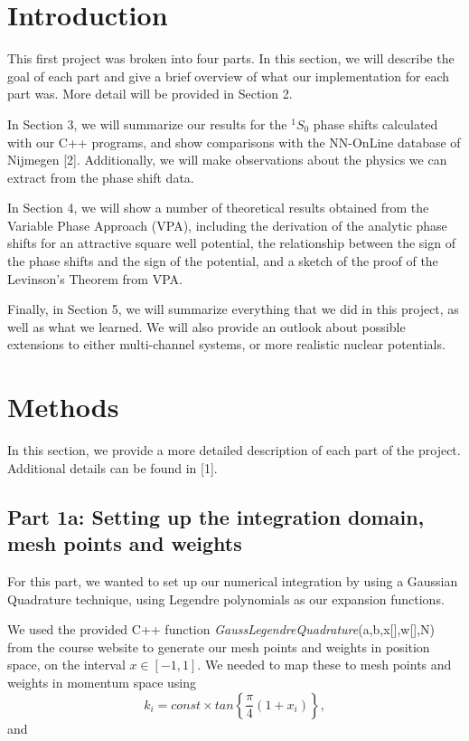 \documentclass{article}
\begin{document}
\begin{multicols}{2}

\section{Introduction}

This first project was broken into four parts. In this section, we will describe the goal of each part and give a brief overview of what our implementation for each part was. More detail will be provided in Section 2.

In Section 3, we will summarize our results for the $^1S_0$ phase shifts calculated with our C++ programs, and show comparisons with the NN-OnLine database of Nijmegen [2]. Additionally, we will make observations about the physics we can extract from the phase shift data. 

In Section 4, we will show a number of theoretical results obtained from the Variable Phase Approach (VPA), including the derivation of the analytic phase shifts for an attractive square well potential, the relationship between the sign of the phase shifts and the sign of the potential, and a sketch of the proof of the Levinson's Theorem from VPA.

Finally, in Section 5, we will summarize everything that we did in this project, as well as what we learned. We will also provide an outlook about possible extensions to either multi-channel systems, or more realistic nuclear potentials.

\section{Methods}

In this section, we provide a more detailed description of each part of the project. Additional details can be found in [1].

\subsection{Part 1a: Setting up the integration domain, mesh points and weights}

For this part, we wanted to set up our numerical integration by using a Gaussian Quadrature technique, using Legendre polynomials as our expansion functions.

We used the provided C++ function \textit{GaussLegendreQuadrature}(a,b,x[],w[],N) from the course website to generate our mesh points and weights in position space, on the interval $ x \in [-1,1]$. We needed to map these to mesh points and weights in momentum space using
\begin{equation*}
          k_i=const\times tan\left\{\frac{\pi}{4}(1+x_i)\right\},
        \end{equation*}
and


\end{multicols}
\end{document}

